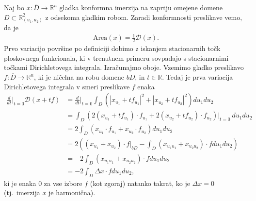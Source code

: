\documentclass[12pt,a4paper,twoside]{article}
\theoremstyle{definition} %
\theoremstyle{plain} %
\numberwithin{equation}{section}  %
\newcommand{\R}{\mathbb R}
\begin{document}
Naj bo $x \colon \overline{D} \to \R^{n}$ gladka konformna imerzija na zaprtju omejene domene $D \subset \R_{(u_1,u_2)}^2$ z odsekoma gladkim robom. 
Zaradi konformnosti preslikave vemo, da je
\begin{gather*}
\text{Area}(x) = \frac{1}{2} \mathcal{D}(x).
\end{gather*}
Prvo variacijo površine po definiciji dobimo z iskanjem stacionarnih točk ploskovnega funkcionala, ki v trenutnem primeru sovpadajo s stacionarnimi točkami Dirichletovega integrala. Izračunajmo oboje. \newline
Vzemimo gladko preslikavo $f \colon \overline{D} \to \R^{n}$, ki je ničelna na robu domene $bD$, in $t \in \R$. Tedaj je prva variacija Dirichletovega integrala v smeri preslikave $f$ enaka
\begin{align*}
\frac{d}{dt} \Big|_{t=0} \mathcal{D}(x+tf) &= \frac{d}{dt} \Big|_{t=0} \int_{D} \left( |x_{u_1}+tf_{u_1}|^2 + |x_{u_2}+tf_{u_2}|^2 \right) du_1 du_2 \\
	&= \int_{D} \left( 2(x_{u_1}+tf_{u_1}) \cdot f_{u_1} + 2(x_{u_2}+tf_{u_2}) \cdot f_{u_2} \right) \big|_{t=0} \ du_1 du_2 \\
	&= 2 \int_{D} \left( x_{u_1} \cdot f_{u_1} + x_{u_2} \cdot f_{u_2} \right) du_1 du_2 \\
	&= 2 \left( (x_{u_1} + x_{u_2}) \cdot f \big|_{bD} - \int_{D} (x_{u_1 u_1} + x_{u_2 u_2}) \cdot f du_1 du_2 \right) \\
	&= -2 \int_{D} (x_{u_1 u_1} + x_{u_2 u_2}) \cdot f du_1 du_2 \\ 
	&= -2 \int_{D} \Delta{x} \cdot f du_1 du_2,
\end{align*}
ki je enaka $0$ za vse izbore $f$ (kot zgoraj) natanko takrat, ko je $\Delta{x} = 0$ (tj.~imerzija $x$ je harmonična). 
\end{document}
